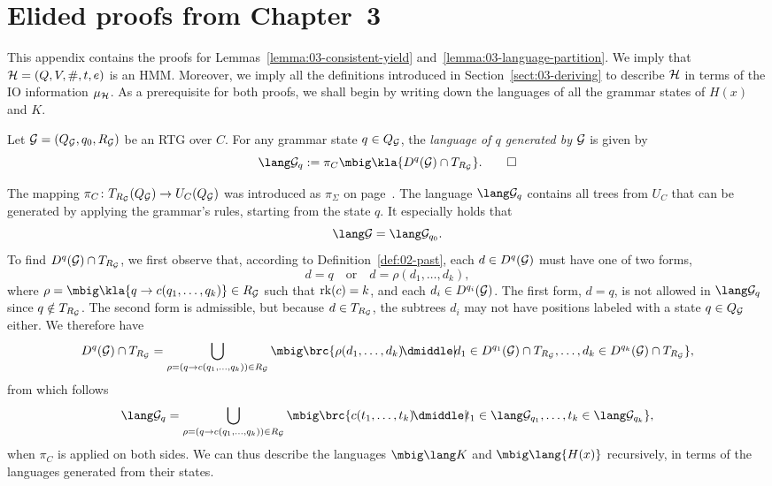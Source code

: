\section{Elided proofs from Chapter~3}\label{sec:appendix-hk-proofs}

This appendix contains the proofs for Lemmas~\ref{lemma:03-consistent-yield}
and~\ref{lemma:03-language-partition}. We imply that $\mathcal H = (Q,V,\#,t,e)$ is an
HMM. Moreover, we imply all the definitions introduced in
Section~\ref{sect:03-deriving} to describe $\mathcal H$ in terms of the IO information $\mu_\mathcal H$.
As a prerequisite for both proofs, we shall begin by writing down the languages
of all the grammar states of $H(x)$ and $K$.

\begin{definition}
 Let $\mathcal G = (Q_\mathcal G,q_0,R_\mathcal G)$ be an RTG over $C$. For any grammar state $q\in
 Q_\mathcal G$, the \emph{language of $q$ generated by $\mathcal G$} is given by
 \[
  \lang\ug_q := \pi_C\mbig\kla{D^q(\ug)\cap T_{R_\ug}}.
  \qedhere
 \]
\end{definition}

The mapping $\pi_C\colon T_{R_\mathcal G}(Q_\mathcal G)\to U_C(Q_\mathcal G)$ was introduced as $\pi_\Sigma$ on
page~\pageref{def:02-pi-sigma}. The language $\lang\ug_q$ contains all trees
from $U_C$ that can be generated by applying the grammar's rules, starting from
the state $q$. It especially holds that
\begin{equation}\label{eq:a1}
 \lang\ug = \lang\ug_{q_0}.
\end{equation}
To find $D^q(\mathcal G)\cap T_{R_\mathcal G}$, we first observe that, according to
Definition~\ref{def:02-past}, each $d\in D^q(\mathcal G)$ must have one of two forms,
\[
 d = q \quad\text{or}\quad d = \rho(d_1,\ldots,d_k),
\]
where $\rho=\mbig\kla{q\to c(q_1,\ldots,q_k)}\in R_\ug$ such that $\operatorname{rk}(c) = k$, and
each $d_i\in D^{q_i}(\mathcal G)$. The first form, $d = q$, is not allowed in
$\lang\ug_q$ since $q\notin T_{R_\mathcal G}$. The second form is admissible, but
because $d\in T_{R_\mathcal G}$, the subtrees $d_i$ may not have positions labeled with
a state $q\in Q_\mathcal G$ either. We therefore have
\[
 D^q(\ug)\cap T_{R_\ug} = \bigcup_{\rho=(q\to c(q_1,\ldots,q_k))\in R_\ug}
 \mbig\brc{\rho(d_1,\ldots,d_k) \npipe d_1\in D^{q_1}(\ug)\cap T_{R_\ug},\ldots, d_k\in D^{q_k}(\ug)\cap T_{R_\ug}},
\]
from which follows
\begin{equation}
 \label{eq:a2}
 \lang\ug_q = \bigcup_{\rho=(q\to c(q_1,\ldots,q_k))\in R_\ug}
 \mbig\brc{c(t_1,\ldots,t_k) \npipe t_1\in\lang\ug_{q_1},\ldots, t_k\in\lang\ug_{q_k}},
\end{equation}
when $\pi_C$ is applied on both sides. We can thus describe the languages
$\mbig\lang K$ and $\mbig\lang{H(x)}$ recursively, in terms of the languages
generated from their states.

